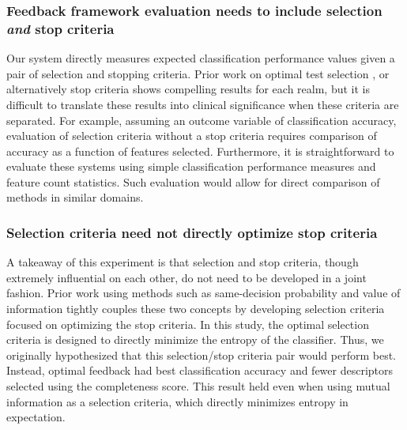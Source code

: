\subsubsection{Feedback framework evaluation needs to include selection \emph{and} stop criteria}
Our system directly measures expected classification performance values given a pair of selection and stopping criteria.
Prior work on  optimal test selection \cite{Greiner:2002wr,Madigan:1996cv, Krause:2005tr}, or alternatively stop criteria \cite{Gaag:2011gs} shows compelling results for each realm, but it is difficult to translate these results into clinical significance when these criteria are separated.
For example, assuming an outcome variable of classification accuracy, evaluation of selection criteria without a stop criteria requires comparison of accuracy as a function of features selected.
Furthermore, it is straightforward to evaluate these systems using simple classification performance measures and feature count statistics.
Such evaluation would allow for direct comparison of methods in similar domains.


\subsubsection{Selection criteria need not directly optimize stop criteria}
A takeaway of this experiment is that selection and stop criteria, though extremely influential on each other, do not need to be developed in a joint fashion.
Prior work using methods such as same-decision probability \cite{Choi:2012id} and value of information \cite{Heckerman:1992uq} tightly couples these two concepts by developing selection criteria focused on optimizing the stop criteria.
In this study, the optimal selection criteria is designed to directly minimize the entropy of the classifier.
Thus, we originally hypothesized that this selection/stop criteria pair would perform best.
Instead, optimal feedback had best classification accuracy and fewer descriptors selected using the completeness score.
This result held even when using mutual information as a selection criteria, which directly minimizes entropy in expectation.


